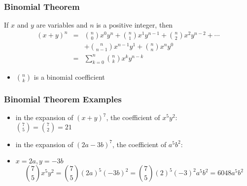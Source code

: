 \documentclass[dvipsnames]{beamer}
\begin{document}
\begin{frame}
  \frametitle{Binomial Theorem}

  \begin{theorem}
    If $x$ and $y$ are variables and $n$ is a positive integer, then
    \begin{eqnarray*}
      (x+y)^n & = & {n\choose 0} x^0 y^n
                    + {n\choose 1} x^1 y^{n-1}
                    + {n\choose 2} x^2 y^{n-2} + \cdots\\
              &   & + {n\choose n-1} x^{n-1} y^1
                    + {n\choose n} x^n y^0 \\
              & = & \sum^n_{k=0}{{n\choose k} x^k y^{n-k}}
    \end{eqnarray*}
  \end{theorem}

  \pause
  \begin{itemize}
    \item ${n\choose k}$ is a \alert{binomial coefficient}
  \end{itemize}
\end{frame}

\begin{frame}
  \frametitle{Binomial Theorem Examples}

  \begin{example}
    \begin{itemize}
      \item in the expansion of $(x+y)^7$, the coefficient of $x^5 y^2$:\\
        ${7\choose 5} = {7 \choose 2} = 21$
    \end{itemize}
  \end{example}

  \pause
  \begin{example}
    \begin{itemize}
      \item in the expansion of $(2a-3b)^7$, the coefficient of $a^5 b^2$:
      \item $x=2a, y=-3b$
      \begin{equation*}
      {7\choose 5} x^5 y^2 = {7\choose 5} (2a)^5 (-3b)^2
                           = {7\choose 5} (2)^5 (-3)^2 a^5 b^2 = 6048 a^5 b^2
      \end{equation*}
    \end{itemize}
  \end{example}  
\end{frame}
\end{document}
